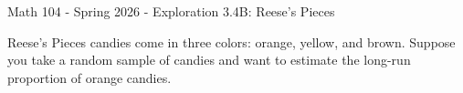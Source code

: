 \documentclass{amsart}
\begin{document}
\pagestyle{empty}
\thispagestyle{empty}


\begin{center}
\LARGE{Math 104 - Spring 2026 - Exploration 3.4B: Reese's Pieces}\\
\end{center}

\bigskip

\noindent Reese's Pieces candies come in three colors: orange, yellow, and brown. Suppose you take a random sample of candies and want to estimate the long-run proportion of orange candies. 
\bigskip

\end{document}

